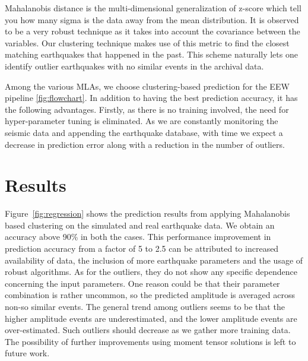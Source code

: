 \documentclass[twocolumn, aps, superscriptaddress]{revtex4}
\begin{document}
Mahalanobis distance is the multi-dimensional generalization of z-score which tell you how many sigma is the data away from the mean distribution. It is observed to be a very robust technique as it takes into account the covariance between the variables. Our clustering technique makes use of this metric to find the closest matching earthquakes that happened in the past. This scheme naturally lets one identify outlier earthquakes with no similar events in the archival data.

Among the various MLAs, we choose clustering-based prediction for the EEW pipeline \ref{fig:flowchart}. In addition to having the best prediction accuracy, it has the following advantages.  Firstly, as there is no training involved, the need for hyper-parameter tuning is eliminated. As we are constantly monitoring the seismic data and appending the earthquake database, with time we expect a decrease in prediction error along with a reduction in the number of outliers. 


\section{Results}\label{sec:results}

Figure~\ref{fig:regression} shows the prediction results from applying Mahalanobis based clustering on the simulated and real earthquake data. We obtain an accuracy above 90\% in both the cases. This performance improvement in prediction accuracy from a factor of 5 to 2.5 can be attributed to increased availability of data, the inclusion of more earthquake parameters and the usage of robust algorithms.  As for the outliers, they do not show any specific dependence concerning the input parameters. One reason could be that their parameter combination is rather uncommon, so the predicted amplitude is averaged across non-so similar events. The general trend among outliers seems to be that the higher amplitude events are underestimated, and the lower amplitude events are over-estimated. Such outliers should decrease as we gather more training data. The possibility of further improvements using moment tensor solutions is left to future work.
\end{document}
